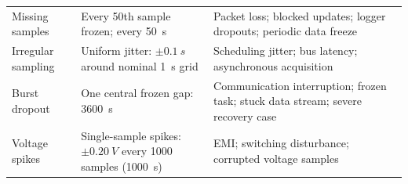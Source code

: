 \documentclass[review]{elsarticle}
\begin{document}
\begin{longtable}{@{}p{1.55cm}p{3.65cm}p{5.75cm}@{}}
    \addlinespace[2pt]
    Missing samples & Every 50th sample frozen; every \SI{50}{s} & Packet loss; blocked updates; logger dropouts; periodic data freeze \cite{naseriReliableWirelessBMS2025,liuAssessingImpactSampling2025} \\
    \addlinespace[2pt]
    Irregular sampling & Uniform jitter: $\pm\SI{0.1}{s}$ around nominal \SI{1}{s} grid & Scheduling jitter; bus latency; asynchronous acquisition \cite{bergerBenchmarkingBatteryManagement2024,naseriReliableWirelessBMS2025,liuAssessingImpactSampling2025} \\
    \addlinespace[2pt]
    Burst dropout & One central frozen gap: \SI{3600}{s} & Communication interruption; frozen task; stuck data stream; severe recovery case \cite{bergerBenchmarkingBatteryManagement2024,naseriReliableWirelessBMS2025} \\
    \addlinespace[2pt]
    Voltage spikes & Single-sample spikes: $\pm\SI{0.20}{V}$ every 1000 samples (\SI{1000}{s}) & EMI; switching disturbance; corrupted voltage samples \cite{aielloElectromagneticSusceptibilityBattery2020} \\
\end{longtable}
\endgroup
\end{document}
